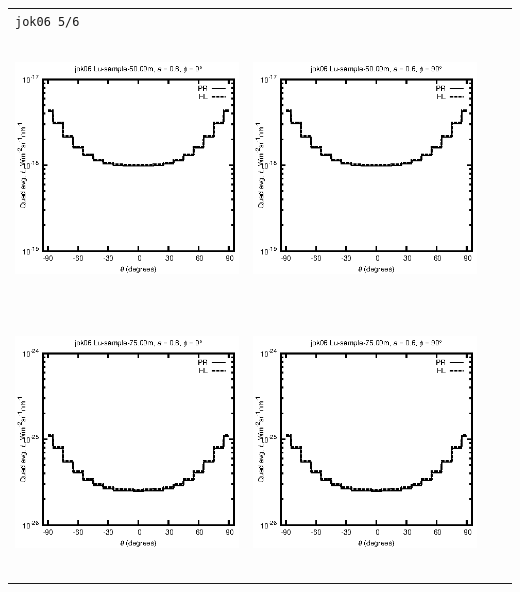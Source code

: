 \documentclass[10pt,a4paper]{article}
\begin{document}
\begin{adjustwidth}{-1.2in}{-1.2in}
\begin{tabular}{c c c c}
\multicolumn{4}{l}{\texttt{jok06 5/6}} \\
\includegraphics[height=7cm]{../eps/jok06_Lu_sample_50.00m_fwd.eps} &
\includegraphics[height=7cm]{../eps/jok06_Lu_sample_50.00m_cross.eps} \\
\includegraphics[height=7cm]{../eps/jok06_Lu_sample_75.00m_fwd.eps} &
\includegraphics[height=7cm]{../eps/jok06_Lu_sample_75.00m_cross.eps} \\

\end{tabular}
\end{adjustwidth}
\end{document}
